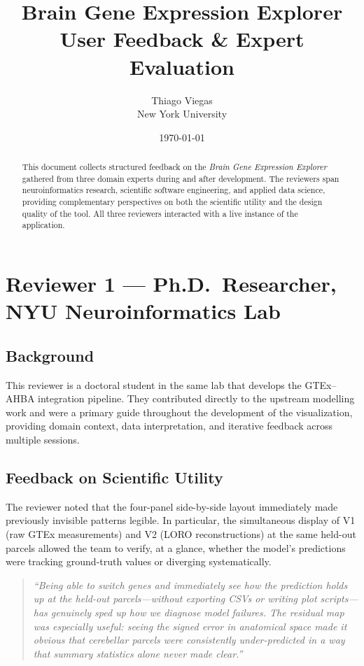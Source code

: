 \documentclass[11pt,letterpaper]{article}
\title{\textbf{Brain Gene Expression Explorer}\\
  \large User Feedback \& Expert Evaluation}
\author{Thiago Viegas\\
  \small New York University}
\date{\today}
\begin{document}
\maketitle

\begin{abstract}
This document collects structured feedback on the \emph{Brain Gene Expression Explorer}
gathered from three domain experts during and after development.
The reviewers span neuroinformatics research, scientific software engineering, and
applied data science, providing complementary perspectives on both the scientific
utility and the design quality of the tool.
All three reviewers interacted with a live instance of the application.
\end{abstract}

\section{Reviewer 1 — Ph.D.\ Researcher, NYU Neuroinformatics Lab}

\subsection*{Background}

This reviewer is a doctoral student in the same lab that develops the GTEx--AHBA
integration pipeline.
They contributed directly to the upstream modelling work and were a primary guide
throughout the development of the visualization, providing domain context, data
interpretation, and iterative feedback across multiple sessions.

\subsection*{Feedback on Scientific Utility}

The reviewer noted that the four-panel side-by-side layout immediately made
previously invisible patterns legible.
In particular, the simultaneous display of V1 (raw GTEx measurements) and V2
(LORO reconstructions) at the same held-out parcels allowed the team to verify,
at a glance, whether the model's predictions were tracking ground-truth values
or diverging systematically.

\begin{quote}
\itshape
``Being able to switch genes and immediately see how the prediction holds up
at the held-out parcels---without exporting CSVs or writing plot scripts---
has genuinely sped up how we diagnose model failures.
The residual map was especially useful: seeing the signed error in anatomical
space made it obvious that cerebellar parcels were consistently under-predicted
in a way that summary statistics alone never made clear.''
\end{quote}
\end{document}

